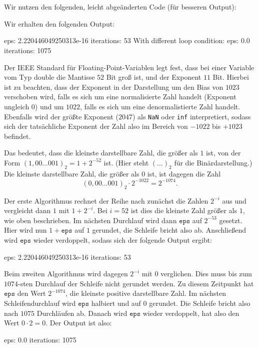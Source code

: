\section{}

Wir nutzen den folgenden, leicht abgeänderten Code (für besseren Output):



Wir erhalten den folgenden Output:

\begin{consoleoutput}
eps: 2.220446049250313e-16
iterations: 53
With different loop condition:
eps: 0.0
iterations: 1075
\end{consoleoutput}

Der IEEE Standard für Floating-Point-Variablen legt fest, dass bei einer Variable vom Typ double die Mantisse $52$ Bit groß ist, und der Exponent $11$ Bit.
Hierbei ist zu beachten, dass der Exponent in der Darstellung um den Bias von $1023$ verschoben wird, falls es sich um eine normalisierte Zahl handelt (Exponent ungleich $0$) und um $1022$, falls es sich um eine denormalistierte Zahl handelt.
Ebenfalls wird der größte Exponent ($2047$) als \texttt{NaN} oder \texttt{inf} interpretiert, sodass sich der tatsächliche Exponent der Zahl also im Bereich von $-1022$ bis $+1023$ befindet.

Das bedeutet, dass die kleinste darstellbare Zahl, die größer als $1$ ist, von der Form $(1,00\dots001)_2 = 1 + 2^{-52}$ ist.
(Hier steht $(\dots)_2$ für die Binärdarstellung.)
Die kleinste darstellbare Zahl, die größer als $0$ ist, ist dagegen die Zahl
\[
    (0,00\dots001)_2 \cdot 2^{-1022}
  = 2^{-1074}.
\]

Der erste Algorithmus rechnet der Reihe nach zunächst die Zahlen $2^{-i}$ aus und vergleicht dann $1$ mit $1 + 2^{-i}$.
Bei $i = 52$ ist dies die kleinste Zahl größer als $1$, wie oben beschrieben.
Im nächsten Durchlauf wird dann $\mathtt{eps}$ auf $2^{-53}$ gesetzt.
Hier wird nun $1 + \mathtt{eps}$ auf $1$ gerundet, die Schleife bricht also ab.
Anschließend wird $\mathtt{eps}$ wieder verdoppelt, sodass sich der folgende Output ergibt:
\begin{consoleoutput}
eps: 2.220446049250313e-16
iterations: 53
\end{consoleoutput}

Beim zweiten Algorithmus wird dagegen $2^{-i}$ mit $0$ verglichen.
Dies muss bis zum $1074$-sten Durchlauf der Schleife nicht gerundet werden.
Zu diesem Zeitpunkt hat $\mathtt{eps}$ den Wert $2^{-1074}$, die kleinste positive darstellbare Zahl.
Im nächsten Schleifendurchlauf wird $\mathtt{eps}$ halbiert und auf $0$ gerundet.
Die Schleife bricht also nach $1075$ Durchläufen ab.
Danach wird $\mathtt{eps}$ wieder verdoppelt, hat also den Wert $0 \cdot 2 = 0$.
Der Output ist also:
\begin{consoleoutput}
eps: 0.0
iterations: 1075
\end{consoleoutput}
